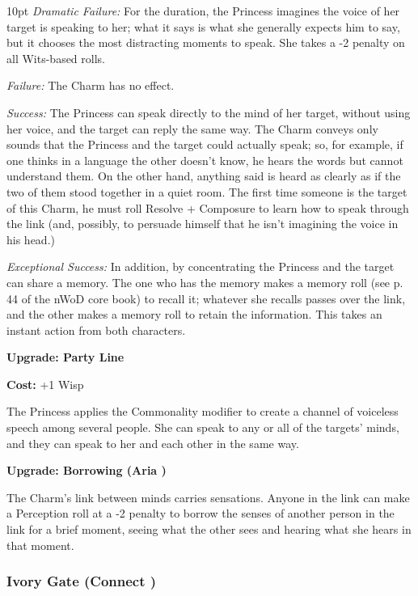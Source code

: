 \begin{myindentpar}{10pt}    \emph{Dramatic Failure:} For the duration, the Princess imagines the voice of her target is speaking to her; what it says is what she generally expects him to say, but it chooses the most distracting moments to speak. She takes a -2 penalty on all Wits-based rolls.
    
	\emph{Failure:} The Charm has no effect.
    
	\emph{Success:} The Princess can speak directly to the mind of her target, without using her voice, and the target can reply the same way. The Charm conveys only sounds that the Princess and the target could actually speak; so, for example, if one thinks in a language the other doesn't know, he hears the words but cannot understand them. On the other hand, anything said is heard as clearly as if the two of them stood together in a quiet room. The first time someone is the target of this Charm, he must roll Resolve + Composure to learn how to speak through the link (and, possibly, to persuade himself that he isn't imagining the voice in his head.)
    
	\emph{Exceptional Success:} In addition, by concentrating the Princess and the target can share a memory. The one who has the memory makes a memory roll (see p. 44 of the nWoD core book) to recall it; whatever she recalls passes over the link, and the other makes a memory roll to retain the information. This takes an instant action from both characters.

\textbf{Upgrade: Party Line}

\noindent \textbf{Cost:} +1 Wisp

The Princess applies the Commonality modifier to create a channel of voiceless speech among several people. She can speak to any or all of the targets' minds, and they can speak to her and each other in the same way. 

\textbf{Upgrade: Borrowing (Aria \textbullet\textbullet)}

The Charm's link between minds carries sensations. Anyone in the link can make a Perception roll at a -2 penalty to borrow the senses of another person in the link for a brief moment, seeing what the other sees and hearing what she hears in that moment.\end{myindentpar}

\subsubsection*{Ivory Gate (Connect \textbullet\textbullet\textbullet)}

